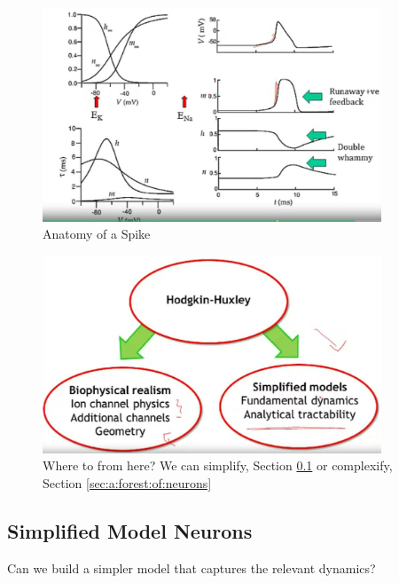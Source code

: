 \documentclass[]{article}
\begin{document}
\begin{figure}[H]
	\caption[Anatomy of a Spike]{Anatomy of a Spike}
	\includegraphics[width=0.9\textwidth]{anatomy-of-a-spike}
\end{figure}

\begin{figure}[H]
	\caption[Where to from here? Simplification or Realism?]{Where to from here? We can simplify, Section \ref{sec:simplified:model_neurons} or complexify, Section \ref{sec:a:forest:of:neurons}}
	\includegraphics[width=0.9\textwidth]{where-to-from-here}
\end{figure}

\subsection{Simplified Model Neurons}\label{sec:simplified:model_neurons}
Can we build a simpler model that captures the relevant dynamics?
\end{document}
